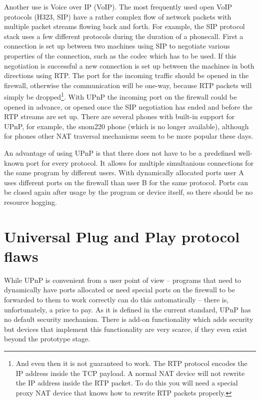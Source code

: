 \documentclass[10pt]{article}
\begin{document}
Another use is Voice over IP (VoIP). The most frequently used open VoIP
protocols (H323, SIP) have a rather complex flow of network packets with
multiple packet streams flowing back and forth. For example, the SIP protocol
stack uses a few different protocols during the duration of a phonecall. First
a connection is set up between two machines using SIP to negotiate various
properties of the connection, such as the codec which has to be used. If this
negotiation is successful a new connection is set up between the
machines in both directions using RTP. The port for the incoming traffic
should be opened in the firewall, otherwise the communication will be one-way,
because RTP packets will simply be dropped\footnote{And even then it is not
guaranteed to work. The RTP protocol encodes the IP address inside the TCP
payload. A normal NAT device will not rewrite the IP address inside the RTP
packet. To do this you will need a special proxy NAT device that knows
how to rewrite RTP packets properly.}. With UPnP the incoming port on the
firewall could be opened in advance, or opened once the SIP negotiation has ended
and before the RTP streams are set up. There are several phones with built-in
support for UPnP, for example, the snom220 phone (which is no longer
available), although for phones other NAT traversal mechanisms seem to be
more popular these days.

An advantage of using UPnP is that there does not have to be a predefined
well-known port for every protocol. It allows for multiple simultanious
connections for the same program by different users. With dynamically allocated
ports user A uses different ports on the firewall than user B for the same
protocol. Ports can be closed again after usage by the program or device
itself, so there should be no resource hogging.


\section{Universal Plug and Play protocol flaws}

While UPnP is convenient from a user point of view -- programs that need to
dynamically have ports allocated or need special ports on the firewall to
be forwarded to them to work correctly can do this automatically -- there is,
unfortunately, a price to pay. As it is defined in the current standard, UPnP
has no default security mechanism. There is add-on functionality which adds
security but devices that implement this functionality are very scarce, if
they even exist beyond the prototype stage.
\end{document}
